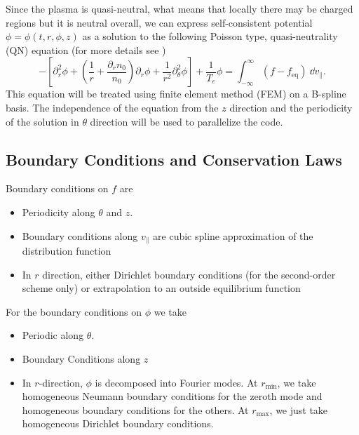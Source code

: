 Since the plasma is quasi-neutral, what means that locally there may be charged regions but it is neutral overall, we can express self-consistent potential $\phi = \phi(t, r, \phi, z)$ as a solution to the following Poisson type, quasi-neutrality (QN) equation (for more details see \cite{emily})
\begin{equation}
- \left[\partial_r^2 \phi + \left( \frac{1}{r} + \frac{\partial_r n_0}{n_0}\right)\partial_r \phi + \frac{1}{r^2} \partial_\theta^2 \phi \right] + \frac{1}{T_e} \phi = \int_{-\infty}^{\infty} (f - f_\text{eq}) \ \dd v_\parallel. \label{eq:qn}
\end{equation}
This equation will be treated using finite element method (FEM) on a B-spline basis. The independence of the equation from the $z$ direction and the periodicity of the solution in $\theta$ direction will be used to parallelize the code.

\subsection{Boundary Conditions and Conservation Laws}

Boundary conditions on $f$ are
\begin{itemize}
    \item Periodicity along $\theta$ and $z$.
    \item Boundary conditions along $v_\parallel$ are cubic spline approximation of the distribution function %
    \item In $r$ direction, either Dirichlet boundary conditions (for the second-order scheme only) or extrapolation to an outside equilibrium function
\end{itemize}

For the boundary conditions on $\phi$ we take
\begin{itemize}
    \item Periodic along $\theta$.
    \item Boundary Conditions along $z$ %
    \item In $r$-direction, $\phi$ is decomposed into Fourier modes. At $r_\text{min}$, we take homogeneous Neumann boundary conditions for the zeroth mode and homogeneous boundary conditions for the others. At $r_\text{max}$, we just take homogeneous Dirichlet boundary conditions.
\end{itemize}

